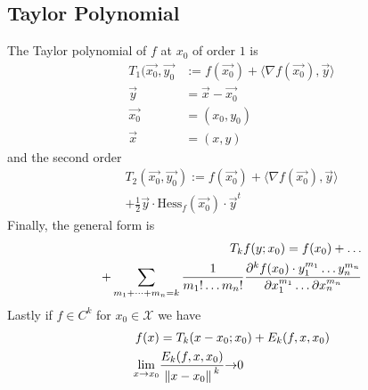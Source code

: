\documentclass[8pt]{extarticle}
\newcommand{\X}{{\mathcal X}}
\newcommand{\ra}{{\rightarrow}}
\begin{document}
\begin{multicols*}{3}
  \subsection{Taylor Polynomial}
  The Taylor polynomial of $f$ at $x_0$
  of order $1$ is
  \begin{align*}
    T_1(\vec{x_0}, \vec{y_0} &:= f(\vec{x_0}) + \langle\nabla f(\vec{x_0}), \vec{y}\rangle \\
    \vec{y}& = \vec{x} - \vec{x_0} \\
    \vec{x_0} &= (x_0, y_0) \\
    \vec{x} &= (x, y)
  \end{align*}
  and the second order
  \begin{align*}
    T_2 (\vec{x_0}, \vec{y_0}) :=  f(\vec{x_0}) + \langle\nabla f(\vec{x_0}), \vec{y}\rangle \\
    + \frac{1}{2}\vec{y} \cdot \text{Hess}_f(\vec{x_0}) \cdot \vec{y}^t
  \end{align*}
  Finally, the general form is
  \begin{align*}
    T_k f(y; x_0) = f(x_0) + \dots \\
    + \sum_{m_1 + \dots + m_n = k} \frac{1}{m_1! \dots m_n!} \pdv{^k f(x_0) \cdot y_1^{m_1} \dots y_n^{m_n}}{x_1^{m_1} \dots \partial x_n^{m_n}}
  \end{align*}
  Lastly if $f \in C^k$ for $x_0 \in \X$ we have
  \begin{align*}
    f(x)             & = T_k(x - x_0; x_0) + E_k(f, x, x_0)           \\
    \lim_{x \ra x_0} & \frac{E_k(f, x, x_0)}{\norm*{x - x_0}^k} \ra 0
  \end{align*}
\begin{tcolorbox}[colback=blue!5!white,colframe=blue!75!black]

\end{tcolorbox}
\end{multicols*}
\end{document}
